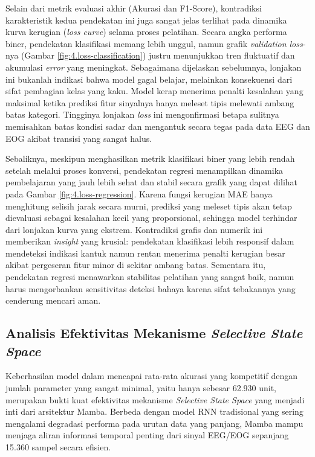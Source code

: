 Selain dari metrik evaluasi akhir (Akurasi dan F1-Score), kontradiksi karakteristik kedua pendekatan ini juga sangat jelas terlihat pada dinamika kurva kerugian (\textit{loss curve}) selama proses pelatihan. Secara angka performa biner, pendekatan klasifikasi memang lebih unggul, namun grafik \textit{validation loss}-nya (Gambar \ref{fig:4.loss-classification}) justru menunjukkan tren fluktuatif dan akumulasi \textit{error} yang meningkat. Sebagaimana dijelaskan sebelumnya, lonjakan ini bukanlah indikasi bahwa model gagal belajar, melainkan konsekuensi dari sifat pembagian kelas yang kaku. Model kerap menerima penalti kesalahan yang maksimal ketika prediksi fitur sinyalnya hanya meleset tipis melewati ambang batas kategori. Tingginya lonjakan \textit{loss} ini mengonfirmasi betapa sulitnya memisahkan batas kondisi sadar dan mengantuk secara tegas pada data EEG dan EOG akibat transisi yang sangat halus.

Sebaliknya, meskipun menghasilkan metrik klasifikasi biner yang lebih rendah setelah melalui proses konversi, pendekatan regresi menampilkan dinamika pembelajaran yang jauh lebih sehat dan stabil secara grafik yang dapat dilihat pada Gambar \ref{fig:4.loss-regression}. Karena fungsi kerugian MAE hanya menghitung selisih jarak secara murni, prediksi yang meleset tipis akan tetap dievaluasi sebagai kesalahan kecil yang proporsional, sehingga model terhindar dari lonjakan kurva yang ekstrem. Kontradiksi grafis dan numerik ini memberikan \textit{insight} yang krusial: pendekatan klasifikasi lebih responsif dalam mendeteksi indikasi kantuk namun rentan menerima penalti kerugian besar akibat pergeseran fitur minor di sekitar ambang batas. Sementara itu, pendekatan regresi menawarkan stabilitas pelatihan yang sangat baik, namun harus mengorbankan sensitivitas deteksi bahaya karena sifat tebakannya yang cenderung mencari aman.

\subsection{Analisis Efektivitas Mekanisme \textit{Selective State Space}}
\label{subsec:analisis_mamba_efektivitas}

Keberhasilan model dalam mencapai rata-rata akurasi yang kompetitif dengan jumlah parameter yang sangat minimal, yaitu hanya sebesar 62.930 unit, merupakan bukti kuat efektivitas mekanisme \textit{Selective State Space} yang menjadi inti dari arsitektur Mamba. Berbeda dengan model RNN tradisional yang sering mengalami degradasi performa pada urutan data yang panjang, Mamba mampu menjaga aliran informasi temporal penting dari sinyal EEG/EOG sepanjang 15.360 sampel secara efisien.

